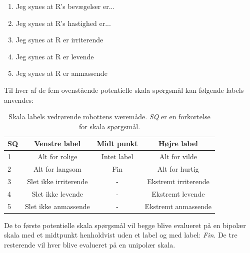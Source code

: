 %
\begin{enumerate}
  \item Jeg synes at R's bevægelser er... 
  \item Jeg synes at R's hastighed er... 
  \item Jeg synes at R er irriterende
  \item Jeg synes at R er levende
  \item Jeg synes at R er anmassende\blankline
\end{enumerate}
%
Til hver af de fem ovenstående potentielle skala spørgsmål kan følgende labels anvendes:
%
\begin{table}[H]
	\centering 
	\begin{tabular}{l|c|c|c}
		SQ     & Venstre label & Midt punkt & Højre label \\\hline
		1   & Alt for rolige & Intet label & Alt for vilde     \\\hline
		2   & Alt for langsom & Fin & Alt for hurtig   \\\hline
		3   & Slet ikke irriterende & - & Ekstremt irriterende \\\hline
	 	4   & Slet ikke levende & - & Ekstremt levende         \\\hline
		5   & Slet ikke anmassende & - & Ekstremt anmassende             
	\end{tabular}
	\caption{Skala labels vedrørende robottens væremåde. \textit{SQ} er en forkortelse for skala spørgsmål.}
	\label{tab:VaeremaadeSkala}
\end{table}
\noindent
%
De to første potentielle skala spørgsmål vil begge blive evalueret på en bipolær skala med et midtpunkt henholdvist uden et label og med label: \textit{Fin}. De tre resterende vil hver blive evalueret på en unipolær skala.
%
